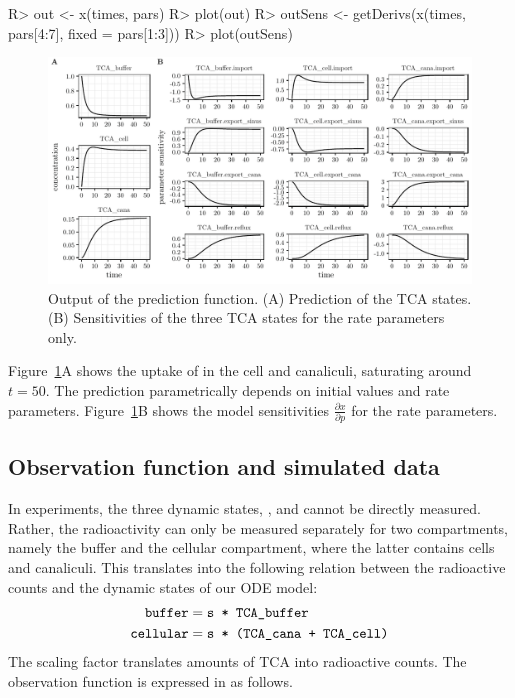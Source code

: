 \documentclass[article]{jss}
\begin{document}
\begin{CodeChunk}
\begin{CodeInput}
R> out <- x(times, pars)
R> plot(out)
R> outSens <- getDerivs(x(times, pars[4:7], fixed = pars[1:3]))
R> plot(outSens)
\end{CodeInput}
\end{CodeChunk}
%
\begin{figure}[t!]
\includegraphics[width = \textwidth]{Figures/figure1}
\caption{Output of the prediction function. (A) Prediction of the TCA states. (B) Sensitivities of the three TCA states for the rate parameters only.\label{fig:prediction}}
\end{figure}
%
Figure~\ref{fig:prediction}A shows the uptake of  in the cell and canaliculi, saturating around $t = 50$. The prediction parametrically depends on initial values and rate parameters. Figure~\ref{fig:prediction}B shows the model sensitivities $\frac{\partial x}{\partial p}$ for the rate parameters.

\subsection{Observation function and simulated data}
In experiments, the three dynamic states, ,  and  cannot be directly measured. Rather, the radioactivity can only be measured separately for two compartments, namely the buffer and the cellular compartment, where the latter contains cells and canaliculi.
This translates into the following relation between the radioactive counts and the dynamic states of our ODE model:
\begin{equation}
\begin{aligned}
\verb!buffer! &= \verb!s * TCA_buffer!\\
\verb!cellular! &= \verb!s * (TCA_cana + TCA_cell)!
\end{aligned}
\label{}
\end{equation}
The scaling factor  translates amounts of TCA into radioactive counts. %
The observation function is expressed in  as follows.
\end{document}
